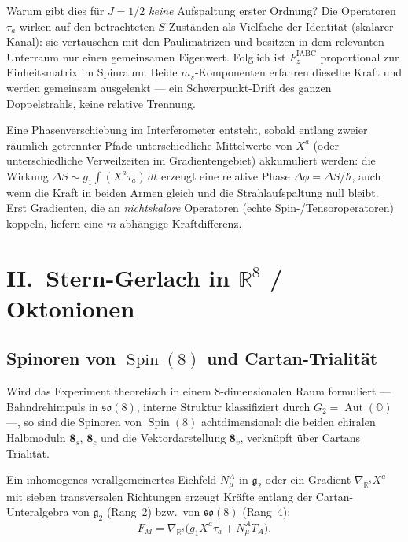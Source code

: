 \documentclass[11pt,a4paper]{article}
\theoremstyle{definition}
\theoremstyle{remark}
\newcommand{\so}{\mathfrak{so}}
\newcommand{\gtwo}{\mathfrak{g}_2}
\newcommand{\Spin}{\operatorname{Spin}}
\newcommand{\Aut}{\operatorname{Aut}}
\newcommand{\R}{\mathbb{R}}
\newcommand{\OO}{\mathbb{O}}
\begin{document}
Warum gibt dies für \(J=1/2\) \emph{keine} Aufspaltung erster Ordnung? Die Operatoren
\(\tau_a\) wirken auf den betrachteten \(S\)-Zuständen als Vielfache der Identität (skalarer
Kanal): sie vertauschen mit den Paulimatrizen und besitzen in dem relevanten Unterraum nur
einen gemeinsamen Eigenwert. Folglich ist \(F_z^{\mathrm{IABC}}\) proportional zur
Einheitsmatrix im Spinraum. Beide \(m_s\)-Komponenten erfahren dieselbe Kraft und werden
gemeinsam ausgelenkt --- ein Schwerpunkt-Drift des ganzen Doppelstrahls, keine relative
Trennung.

Eine Phasenverschiebung im Interferometer entsteht, sobald entlang zweier räumlich
getrennter Pfade unterschiedliche Mittelwerte von \(X^a\) (oder unterschiedliche Verweilzeiten
im Gradientengebiet) akkumuliert werden: die Wirkung
\(\Delta S\sim g_1\int(X^a\tau_a)\,dt\) erzeugt eine relative Phase \(\Delta\phi=\Delta S/\hbar\),
auch wenn die Kraft in beiden Armen gleich und die Strahlaufspaltung null bleibt. Erst
Gradienten, die an \emph{nichtskalare} Operatoren (echte Spin-/Tensoroperatoren) koppeln,
liefern eine \(m\)-abhängige Kraftdifferenz.

\section{II.\ Stern-Gerlach in \texorpdfstring{\(\R^8\)}{R\string^8} / Oktonionen}

\subsection{Spinoren von \texorpdfstring{\(\Spin(8)\)}{Spin(8)} und Cartan-Trialität}

Wird das Experiment theoretisch in einem 8-dimensionalen Raum formuliert --- Bahndrehimpuls
in \(\so(8)\), interne Struktur klassifiziert durch \(G_2=\Aut(\OO)\) ---, so sind die
Spinoren von \(\Spin(8)\) achtdimensional: die beiden chiralen Halbmoduln \(\mathbf{8}_s\),
\(\mathbf{8}_c\) und die Vektordarstellung \(\mathbf{8}_v\), verknüpft über Cartans Trialität.

Ein inhomogenes verallgemeinertes Eichfeld \(N_\mu^A\) in \(\gtwo\) oder ein Gradient
\(\nabla_{\R^8}X^a\) mit sieben transversalen Richtungen erzeugt Kräfte entlang der
Cartan-Unteralgebra von \(\gtwo\) (Rang~2) bzw.\ von \(\so(8)\) (Rang~4):
\begin{equation}
  F_M=\nabla_{\R^8}\bigl(g_1 X^a\tau_a+N_\mu^A T_A\bigr).
\end{equation}
\end{document}
